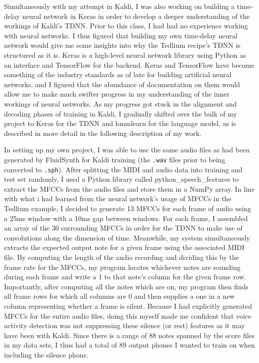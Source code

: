 \documentclass[conference]{IEEEtran}
\begin{document}
Simultaneously with my attempt in Kaldi, I was also working on building a time-delay neural network in Keras in order to develop a deeper understanding of the workings of Kaldi's TDNN. Prior to this class, I had had no experience working with neural networks. I thus figured that building my own time-delay neural network would give me some insights into why the Tedlium recipe's TDNN is structured as it is. Keras is a high-level neural network library using Python as an interface and TensorFlow for the backend. Keras and TensorFlow have become something of the industry standards as of late for building artificial neural networks, and I figured that the abundance of documentation on them would allow me to make much swifter progress in my understanding of the inner workings of neural networks. As my progress got stuck in the alignment and decoding phases of training in Kaldi, I gradually shifted over the bulk of my project to Keras for the TDNN and hmmlearn for the language model, as is described in more detail in the following description of my work.

In setting up my own project, I was able to use the same audio files as had been generated by FluidSynth for Kaldi training (the \texttt{.wav} files prior to being converted to \texttt{.sph}). After splitting the MIDI and audio data into training and test set randomly, I used a Python library called python\_speech\_features to extract the MFCCs from the audio files and store them in a NumPy array. In line with what i had learned from the neural network's usage of MFCCs in the Tedlium example, I decided to generate 13 MFCCs for each frame of audio using a 25ms window with a 10ms gap between windows. For each frame, I assembled an array of the 30 surrounding MFCCs in order for the TDNN to make use of convolutions along the dimension of time. Meanwhile, my system simultaneously extracts the expected output note for a given frame using the associated MIDI file. By computing the length of the audio recording and dividing this by the frame rate for the MFCCs, my program locates whichever notes are sounding during each frame and write a 1 to that note's column for the given frame row. Importantly, after computing all the notes which are on, my program then finds all frame rows for which all columns are 0 and then supplies a one in a new column representing whether a frame is silent. Because I had explicitly generated MFCCs for the entire audio files, doing this myself made me confident that voice activity detection was not suppressing these silence (or rest) features as it may have been with Kaldi. Since there is a range of 88 notes spanned by the score files in my data sets, I thus had a total of 89 output phones I wanted to train on when including the silence phone.
\end{document}
